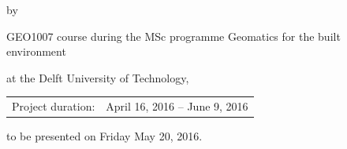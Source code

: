 \begin{titlepage}


\begin{center}


{\makeatletter
\largetitlestyle\fontsize{64}{94}\selectfont\@title
\makeatother}

{\makeatletter
\ifx\@subtitle\undefined\else
    \bigskip
   {\tudsffamily\fontsize{22}{32}\selectfont\@subtitle}    
\fi
\makeatother}

\bigskip
\bigskip

by

\bigskip
\bigskip

{\makeatletter
\largetitlestyle\fontsize{26}{26}\selectfont\@author
\makeatother}

\bigskip
\bigskip

{\fontsize{15}{0.2}\selectfont GEO1007 course during the MSc programme Geomatics for the built environment

at the Delft University of Technology,}

\vfill

\begin{tabular}{lll}
    Project duration: & \multicolumn{2}{l}{April 16, 2016 -- June 9, 2016} \\
\end{tabular}

\bigskip
\bigskip
\bigskip
\bigskip
to be presented on Friday May 20, 2016.
\end{center}


\end{titlepage}


